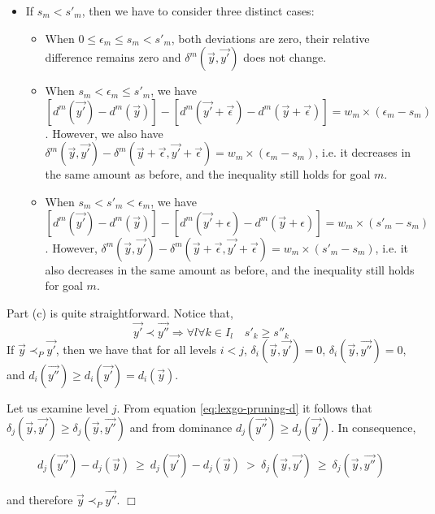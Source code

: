 \begin{demo}
\begin{itemize}
	\item If $s_m < s'_m$, then we have to consider three distinct cases:
	\begin{itemize}
		\item When $0 \leq \epsilon_m \leq s_m < s'_m$, both deviations are zero, their relative difference remains zero and $\delta^m(\vec{y},\vec{y'})$ does not change.
		\item When $ s_m < \epsilon_m \leq s'_m$, we have $[d^m(\vec{y'}) - d^m(\vec{y}) ] - [d^m(\vec{y'} + \vec\epsilon) - d^m(\vec{y} + \vec\epsilon)] = w_m \times (\epsilon_m - s_m)$. However, we also have $\delta^m(\vec{y},\vec{y'}) - \delta^m(\vec{y} + \vec\epsilon,\vec{y'}+ \vec\epsilon) = w_m \times (\epsilon_m - s_m)$, i.e. it decreases in the same amount as before, and the inequality still holds for goal $m$. 
		\item When $ s_m  < s'_m < \epsilon_m$, we have $[d^m(\vec{y'}) - d^m(\vec{y}) ] - [d^m(\vec{y'} + \epsilon) - d^m(\vec{y} + \epsilon)] = w_m \times (s'_m - s_m)$. However, $\delta^m(\vec{y},\vec{y'}) - \delta^m(\vec{y} + \vec\epsilon,\vec{y'}+ \vec\epsilon) = w_m \times (s'_m - s_m)$, i.e. it also decreases in the same amount as before, and the inequality still holds for goal $m$. 
		\end{itemize}
\end{itemize}

Part (c) is quite straightforward. Notice that,
\begin{equation}
\vec{y'} \prec \vec{y''}  \Rightarrow  \forall l \forall k \in I_l \quad s'_k \geq s''_k
\label{eq:lexgo-pruning-d}
\end{equation}
If  $\vec{y} \prec_{P} \vec{y'}$, then we have that for all levels $i<j$, $\delta_i(\vec y, \vec{y'}) = 0$, 
$\delta_i(\vec y, \vec{y''}) = 0$, and $d_i(\vec{y''}) \geq d_i(\vec{y'}) = d_i(\vec{y})$. 

Let us examine level $j$. From equation \ref{eq:lexgo-pruning-d} it follows that $\delta_j(\vec y, \vec{y'}) \geq \delta_j(\vec y, \vec{y''})$ and from dominance $d_j(\vec{y''}) \geq d_j(\vec{y'})$. In consequence,

\begin{equation}
d_j(\vec{y''}) - d_j(\vec{y}) \  \geq \ d_j(\vec{y'}) - d_j(\vec{y}) \ > \ \delta_j(\vec y, \vec{y'}) \  \geq \ \delta_j(\vec y, \vec{y''})
\label{eq:lexgo-pruning-e}
\end{equation}

\noindent and therefore $\vec{y} \prec_{P} \vec{y''}$. $\Box$

\end{demo}

